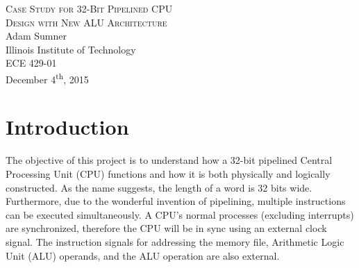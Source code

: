 \documentclass[12pt]{article}
\begin{document}
\begin{titlepage}
	\begin{center}
		
		
		\vfill
		
		\textsc{\LARGE Case Study for 32-Bit Pipelined CPU\\[0.2cm] Design with New ALU Architecture}\\[1.5cm]
		
		\Large Adam Sumner\\[0.5cm]
		
		\Large Illinois Institute of Technology\\[0.5cm]
		
		\Large ECE 429-01\\[0.5cm]
		
		\Large December 4\textsuperscript{th}, 2015	
		
		\noindent
		\vfill
	
		
	\end{center}
\end{titlepage}
\tableofcontents
\newpage
\section{Introduction}
The objective of this project is to understand how a 32-bit pipelined Central Processing Unit (CPU) functions and how it is both physically and logically constructed. As the name suggests, the length of a word is 32 bits wide. Furthermore, due to the wonderful invention of pipelining, multiple instructions can be executed simultaneously. A CPU's normal processes (excluding interrupts) are synchronized, therefore the CPU will be in sync using an external clock signal. The instruction signals for addressing the memory file, Arithmetic Logic Unit (ALU) operands, and the ALU operation are also external. 
\end{document}
